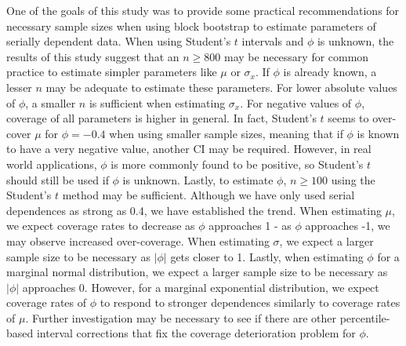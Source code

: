 \documentclass[10pt]{article}
\begin{document}
One of the goals of this study was to provide some practical recommendations for 
necessary sample sizes when using block bootstrap to estimate parameters of 
serially dependent data. When using Student's $t$ intervals and $\phi$ is 
unknown, the results of this study suggest that an $n \geq 800$ may be necessary 
for common practice to estimate simpler parameters like $\mu$ or $\sigma_x$. If 
$\phi$ is already known, a lesser $n$ may be adequate to estimate these 
parameters. For lower absolute values of $\phi$, a smaller $n$ is sufficient 
when estimating $\sigma_x$. For negative values of $\phi$, coverage of all 
parameters is higher in general. In fact, Student's $t$ seems to over-cover 
$\mu$ for $\phi = - 0.4$ when using smaller sample sizes, meaning that if $\phi$ 
is known to have a very negative value, another CI may be required. However, in 
real world applications, $\phi$ is more commonly found to be positive, so 
Student's $t$ should still be used if $\phi$ is unknown. Lastly, to estimate 
$\phi$, $n \geq 100$ using the Student's $t$ method may be sufficient. Although
we have only used serial dependences as strong as 0.4, we have established the 
trend. When estimating $\mu$, we expect coverage rates to decrease as
$\phi$ approaches 1 - as $\phi$ approaches -1, we may observe increased 
over-coverage. When estimating $\sigma$, we expect a larger sample size to
be necessary as $|\phi|$ gets closer to 1. Lastly, when estimating $\phi$ for
a marginal normal distribution, we 
expect a larger sample size to be necessary as $|\phi|$ approaches 0. However, 
for a marginal exponential distribution, we expect coverage rates of $\phi$ to 
respond
to stronger dependences similarly to coverage rates of $\mu$. Further
investigation may be necessary to see if there are other percentile-based 
interval corrections
that fix the coverage deterioration problem for $\phi$.
\end{document}

